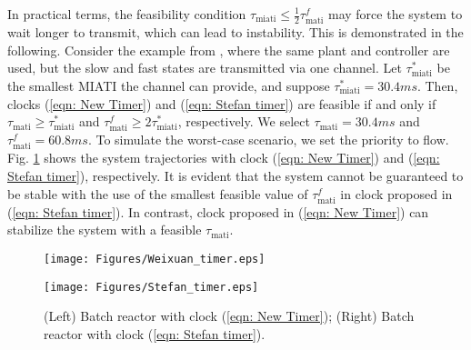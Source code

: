 \begin{remark}

In practical terms, the feasibility condition $\tau_{\text{miati}} \leq  \tfrac{1}{2}\tau_{\text{mati}}^f$ may force the system to wait longer to transmit, which can lead to instability. This is demonstrated in the following. Consider the example from \cite[Section 4.4]{Stefan_thesis}, where the same plant and controller are used, but the slow and fast states are transmitted via one channel. 
Let $\tau_{\text{miati}}^*$ be the smallest MIATI the channel can provide, and suppose $\tau_{\text{miati}}^*=30.4ms$. Then, clocks (\ref{eqn: New Timer}) and (\ref{eqn: Stefan timer}) are feasible if and only if $\tau_{\text{mati}} \geq \tau_{\text{miati}}^*$ and $\tau_{\text{mati}}^f \geq 2\tau_{\text{miati}}^*$, respectively. We select $\tau_{\text{mati}} = 30.4ms$ and $ \tau_{\text{mati}}^f = 60.8ms$. 
%
To simulate the worst-case scenario, we set the priority to flow. 
Fig. \ref{fig: comparison-example} shows the system trajectories with clock (\ref{eqn: New Timer}) and (\ref{eqn: Stefan timer}), respectively. 
%
It is evident that the system cannot be guaranteed to be stable with the use of the smallest feasible value of $\tau_{\text{mati}}^f$ in clock proposed in (\ref{eqn: Stefan timer}). 
%
In contrast, clock proposed in (\ref{eqn: New Timer}) can stabilize the system with a feasible $\tau_{\text{mati}}$.
\end{remark}
%
\begin{figure}[ht]
    \centering
    \hfill
    \begin{minipage}[t]{0.49\linewidth}
    \centering
    \texttt{[image: Figures/Weixuan\_timer.eps]}
    \end{minipage}
    \begin{minipage}[t]{0.49\linewidth}
       \texttt{[image: Figures/Stefan\_timer.eps]}
    \end{minipage}
    \caption{(Left) Batch reactor with clock (\ref{eqn: New Timer}); (Right) Batch reactor with clock (\ref{eqn: Stefan timer}).}
     \label{fig: comparison-example}
\end{figure}


